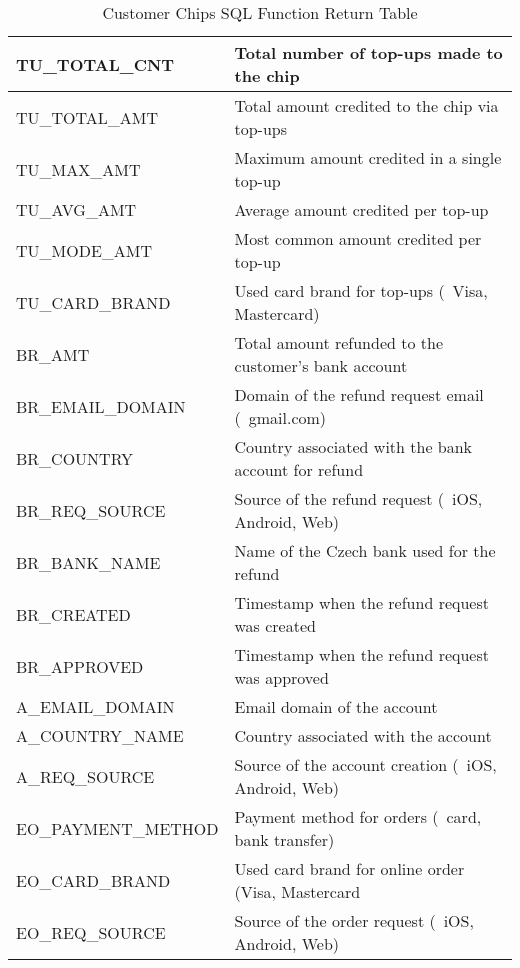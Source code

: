 {\begin{table}[htbp]
\begin{tabularx}{\textwidth}{
		|>{\columncolor{unicorn_blue!5}\raggedright\arraybackslash}p{4.5cm}
		|>{\columncolor{unicorn_blue!5}\raggedright\arraybackslash}X|
	}
		TU\_TOTAL\_CNT & Total number of top-ups made to the chip \\\hline
		TU\_TOTAL\_AMT & Total amount credited to the chip via top-ups \\\hline
		TU\_MAX\_AMT & Maximum amount credited in a single top-up \\\hline
		TU\_AVG\_AMT & Average amount credited per top-up \\\hline
		TU\_MODE\_AMT & Most common amount credited per top-up \\\hline
		TU\_CARD\_BRAND & Used card brand for top-ups (\eg~Visa, Mastercard) \\\hline
		\noalign{\vspace{2mm}}
		\hline
		BR\_AMT & Total amount refunded to the customer's bank account \\\hline
		BR\_EMAIL\_DOMAIN & Domain of the refund request email (\eg~gmail.com) \\\hline
		BR\_COUNTRY & Country associated with the bank account for refund \\\hline
		BR\_REQ\_SOURCE & Source of the refund request (\eg~iOS, Android, Web) \\\hline
		BR\_BANK\_NAME & Name of the Czech bank used for the refund \\\hline
		BR\_CREATED & Timestamp when the refund request was created \\\hline
		BR\_APPROVED & Timestamp when the refund request was approved \\\hline
		\noalign{\vspace{2mm}}
		\hline
		A\_EMAIL\_DOMAIN & Email domain of the account \\\hline
		A\_COUNTRY\_NAME & Country associated with the account \\\hline
		A\_REQ\_SOURCE & Source of the account creation (\eg~iOS, Android, Web) \\\hline
		EO\_PAYMENT\_METHOD & Payment method for orders (\eg~card, bank transfer) \\\hline
		EO\_CARD\_BRAND & Used card brand for online order (Visa, Mastercard \\\hline
		EO\_REQ\_SOURCE & Source of the order request (\eg~iOS, Android, Web) \\\hline
	\end{tabularx}
	\caption{Customer Chips SQL Function Return Table}
	\label{tab:chip-customers-columns}
	\source
\end{table}}

